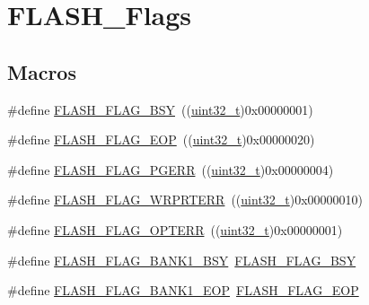 \hypertarget{group___f_l_a_s_h___flags}{}\section{F\+L\+A\+S\+H\+\_\+\+Flags}
\label{group___f_l_a_s_h___flags}
\subsection*{Macros}
\begin{DoxyCompactItemize}
\item 
\#define \hyperlink{group___f_l_a_s_h___flags_gad3bc368f954ad7744deda3315da2fff7}{F\+L\+A\+S\+H\+\_\+\+F\+L\+A\+G\+\_\+\+B\+SY}~((\hyperlink{_p_e___types_8h_a33594304e786b158f3fb30289278f5af}{uint32\+\_\+t})0x00000001)
\item 
\#define \hyperlink{group___f_l_a_s_h___flags_gaf043ba4d8f837350bfc7754a99fae5a9}{F\+L\+A\+S\+H\+\_\+\+F\+L\+A\+G\+\_\+\+E\+OP}~((\hyperlink{_p_e___types_8h_a33594304e786b158f3fb30289278f5af}{uint32\+\_\+t})0x00000020)
\item 
\#define \hyperlink{group___f_l_a_s_h___flags_gae2ef62dee0a5ca01e6226746039b6f20}{F\+L\+A\+S\+H\+\_\+\+F\+L\+A\+G\+\_\+\+P\+G\+E\+RR}~((\hyperlink{_p_e___types_8h_a33594304e786b158f3fb30289278f5af}{uint32\+\_\+t})0x00000004)
\item 
\#define \hyperlink{group___f_l_a_s_h___flags_ga5c59a7f07507cac38091275964d3d35d}{F\+L\+A\+S\+H\+\_\+\+F\+L\+A\+G\+\_\+\+W\+R\+P\+R\+T\+E\+RR}~((\hyperlink{_p_e___types_8h_a33594304e786b158f3fb30289278f5af}{uint32\+\_\+t})0x00000010)
\item 
\#define \hyperlink{group___f_l_a_s_h___flags_gac36b0605df97c9414933369a32251e4a}{F\+L\+A\+S\+H\+\_\+\+F\+L\+A\+G\+\_\+\+O\+P\+T\+E\+RR}~((\hyperlink{_p_e___types_8h_a33594304e786b158f3fb30289278f5af}{uint32\+\_\+t})0x00000001)
\item 
\#define \hyperlink{group___f_l_a_s_h___flags_ga1f85e6d511503886e9fbe7d0228c97a4}{F\+L\+A\+S\+H\+\_\+\+F\+L\+A\+G\+\_\+\+B\+A\+N\+K1\+\_\+\+B\+SY}~\hyperlink{group___f_l_a_s_h___flags_gad3bc368f954ad7744deda3315da2fff7}{F\+L\+A\+S\+H\+\_\+\+F\+L\+A\+G\+\_\+\+B\+SY}
\item 
\#define \hyperlink{group___f_l_a_s_h___flags_gafa7670ee5ce8a2eb1f64c458a9f08e5b}{F\+L\+A\+S\+H\+\_\+\+F\+L\+A\+G\+\_\+\+B\+A\+N\+K1\+\_\+\+E\+OP}~\hyperlink{group___f_l_a_s_h___flags_gaf043ba4d8f837350bfc7754a99fae5a9}{F\+L\+A\+S\+H\+\_\+\+F\+L\+A\+G\+\_\+\+E\+OP}
\item 

\end{DoxyCompactItemize}
